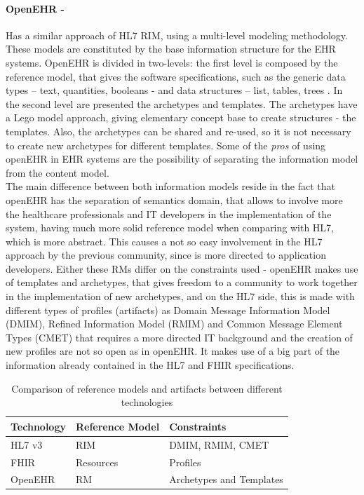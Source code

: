 \documentclass[mim_thesis.tex]{subfiles}
\begin{document}
\paragraph{\textbf{OpenEHR -}}
Has a similar approach of HL7 RIM, using a multi-level modeling methodology. These models are constituted by the base information structure for the EHR systems. OpenEHR is divided in two-levels: the first level is composed by the reference model, that gives the software specifications, such as the generic data types – text, quantities, booleans - and data structures – list, tables, trees \citep{sinha2012electronic}\citep{cresswell2013ten}. In the second level are presented the archetypes and templates. The archetypes have a Lego\texttrademark{ } model approach, giving elementary concept base to create structures - the templates. Also, the archetypes can be shared and re-used, so it is not necessary to create new archetypes for different templates. Some of the \textit{pros} of using openEHR in EHR systems are the possibility of separating the information model from the content model.\\

The main difference between both information models reside in the fact that openEHR has the separation of semantics domain, that allows to involve more the healthcare professionals and IT developers in the implementation of the system, having much more solid reference model when comparing with HL7, which is more abstract. This causes a not so easy involvement in the HL7 approach by the previous community, since is more directed to application developers. Either these RMs differ on the constraints used - openEHR makes use of templates and archetypes, that gives freedom to a community to work together in the implementation of new archetypes, and on the HL7 side, this is made with different types of profiles (artifacts) as Domain Message Information Model (DMIM), Refined Information Model (RMIM) and Common Message Element Types (CMET) \citep{Grieve2016vid} that requires a more directed IT background and the creation of new profiles are not so open as in openEHR. It makes use of a big part of the information already contained in the HL7 and FHIR specifications. \\



\begin{table}[h]
\centering
	\caption{Comparison of reference models and artifacts between different technologies \citep{Grieve2016vid}}
	\label{tab:RM_comparision}
	\begin{tabular}{lll}
		\toprule[2pt]
		\cmidrule(r){1-2}
		\textbf{Technology}    & \textbf{Reference Model} & \textbf{Constraints} \\
		\midrule[2pt]
		HL7 v3  & RIM & DMIM, RMIM, CMET \\
		\midrule
		FHIR & Resources & Profiles \\
		\midrule
		OpenEHR & RM & Archetypes and Templates \\
		\bottomrule[2pt]
\end{tabular}
\end{table}
\end{document}
